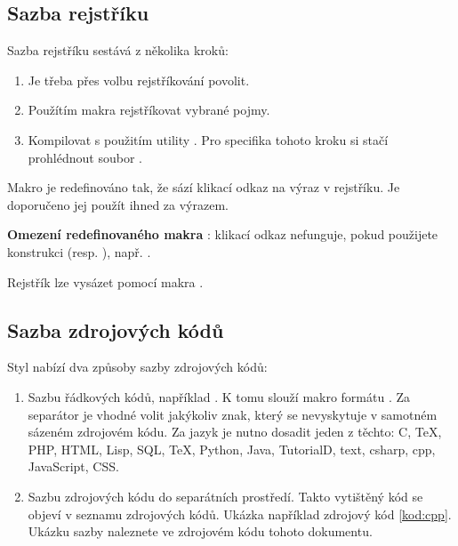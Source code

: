 \documentclass[
  field=inf,
  biblatex,
  glossaries,
  index
]{kidiplom}
\begin{document}
\subsection{Sazba rejstříku}
Sazba rejstříku sestává z několika kroků:

\begin{enumerate}
\item Je třeba přes volbu  rejstříkování povolit.
\item Použítím makra  rejstříkovat vybrané pojmy.
\item Kompilovat s použitím utility . Pro specifika tohoto kroku si stačí prohlédnout soubor .
\end{enumerate}

Makro  je redefinováno tak, že sází klikací odkaz na výraz v rejstříku. Je doporučeno jej použít ihned za výrazem.

\textbf{Omezení redefinovaného makra }: klikací odkaz nefunguje, pokud použijete konstrukci  (resp. ), např. .

Rejstřík lze vysázet pomocí makra .

\subsection{Sazba zdrojových kódů}
Styl nabízí dva způsoby sazby zdrojových kódů:

\begin{enumerate}
\item Sazbu řádkových kódů, například . K tomu slouží makro formátu . Za separátor je vhodné volit jakýkoliv znak, který se nevyskytuje v samotném sázeném zdrojovém kódu. Za jazyk je nutno dosadit jeden z těchto: C, TeX, PHP, HTML, Lisp, SQL, TeX, Python, Java, TutorialD, text, csharp, cpp, JavaScript, CSS.

\item Sazbu zdrojových kódu do separátních prostředí. Takto vytištěný kód se objeví v seznamu zdrojových kódů. Ukázka například zdrojový kód \ref{kod:cpp}. Ukázku sazby naleznete ve zdrojovém kódu tohoto dokumentu.
\end{enumerate}
\end{document}
